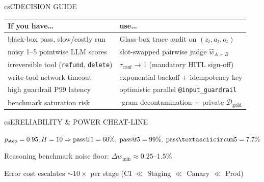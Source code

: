 \documentclass[../../../../master.tex]{subfiles}
\begin{document}
\begin{cscolumns}
\begin{cscard}{csC}{DECISION GUIDE}
  \renewcommand{\arraystretch}{1.18}\small
  \begin{tabular}{@{}>{\raggedright\arraybackslash}p{3.2cm}>{\raggedright\arraybackslash}p{4.7cm}@{}}
    \textbf{If you have\ldots} & \textbf{use\ldots}\\ \hline
    black-box pass, slow/costly run & Glass-box trace audit on $(z_t,a_t,o_t)$\\
    noisy 1--5 pointwise LLM scores & slot-swapped pairwise judge $\hat w_{A\succ B}$\\
    irreversible tool (\texttt{refund}, \texttt{delete}) & $\tau_{\mathrm{conf}}\to 1$ (mandatory HITL sign-off)\\
    write-tool network timeout & exponential backoff + idempotency key\\
    high guardrail P99 latency & optimistic parallel \texttt{@input\_guardrail}\\
    benchmark saturation risk & 8-gram decontamination + private $\mathcal{D}_{\mathrm{gold}}$\\
  \end{tabular}
\end{cscard}

\begin{cscard}{csE}{RELIABILITY \& POWER CHEAT-LINE}
  \begin{csbul}
    \item $p_{\mathrm{step}}=0.95, H=10 \Rightarrow \mathrm{pass@}1=60\%,\; \mathrm{pass@}5=99\%,\; \mathrm{pass\textasciicircum}5=7.7\%$
    \item Reasoning benchmark noise floor: $\Delta w_{\min}\approx 0.25$--$1.5\%$
    \item Error cost escalates $\sim 10\times$ per stage (CI $\ll$ Staging $\ll$ Canary $\ll$ Prod)
  \end{csbul}
\end{cscard}


\end{cscolumns}
\end{document}
